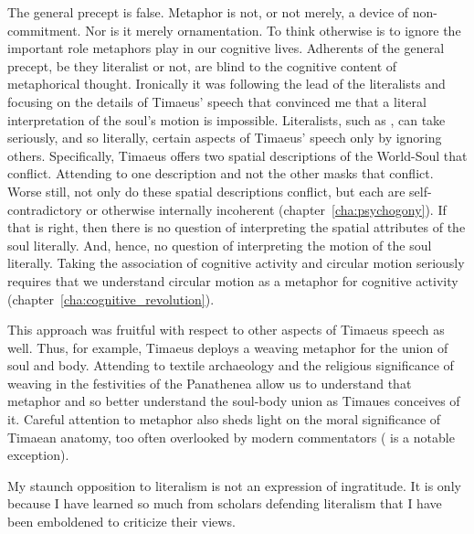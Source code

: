 The general precept is false. Metaphor is not, or not merely, a device of non-commit\-ment. Nor is it merely ornamentation. To think otherwise is to ignore the important role metaphors play in our cognitive lives. Adherents of the general precept, be they literalist or not, are blind to the cognitive content of metaphorical thought. Ironically it was following the lead of the literalists and focusing on the details of Timaeus' speech that convinced me that a literal interpretation of the soul's motion is impossible. Literalists, such as \citet{Sedley:1997kr}, can take seriously, and so literally, certain aspects of Timaeus' speech only by ignoring others. Specifically, Timaeus offers two spatial descriptions of the World-Soul that conflict. Attending to one description and not the other masks that conflict. Worse still, not only do these spatial descriptions conflict, but each are self-contradictory or otherwise internally incoherent (chapter~\ref{cha:psychogony}). If that is right, then there is no question of interpreting the spatial attributes of the soul literally. And, hence, no question of interpreting the motion of the soul literally. Taking the association of cognitive activity and circular motion seriously requires that we understand circular motion as a metaphor for cognitive activity (chapter~\ref{cha:cognitive_revolution}). 

This approach was fruitful with respect to other aspects of Timaeus speech as well. Thus, for example, Timaeus deploys a weaving metaphor for the union of soul and body. Attending to textile archaeology and the religious significance of weaving in the festivities of the Panathenea allow us to understand that metaphor and so better understand the soul-body union as Timaues conceives of it. Careful attention to metaphor also sheds light on the moral significance of Timaean anatomy, too often overlooked by modern commentators (\citealt{Steel:2001ay} is a notable exception).

My staunch opposition to literalism is not an expression of ingratitude. It is only because I have learned so much from scholars defending literalism that I have been emboldened to criticize their views.



